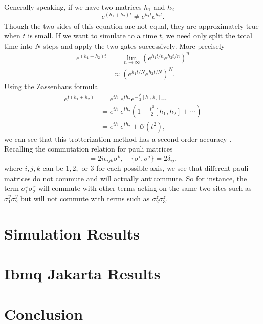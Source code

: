 \documentclass[aps,prl, reprint]{revtex4-2}
\begin{document}
Generally speaking, if we have two matrices $h_1$ and $h_2$
\begin{equation}
e^{(h_1 + h_2)t} \neq e^{h_1 t}e^{h_2 t}.
\end{equation}
Though the two sides of this equation are not equal, they are approximately true when $t$ is small. If we want to simulate to a time $t$, we need only split the total time into $N$ steps and apply the two gates successively. More precisely
\begin{align}
e^{(h_1 + h_2)t}&=\lim _{n \rightarrow \infty}\left(e^{h_1 t/ n} e^{h_2 t / n}\right)^{n}\\
&\approx \left(e^{h_1 t / N} e^{h_2 t/ N}\right)^{N}.
\end{align}
Using the Zassenhaus formula 
\begin{align*}
e^{t(h_1+h_2)}&=e^{t h_1} e^{t h_2} e^{-\frac{t^{2}}{2}[h_1, h_2]}\cdots\\
&= e^{t h_1} e^{t h_2}(1 -\frac{t^{2}}{2}[h_1, h_2] + \cdots)\\
&=e^{t h_1} e^{t h_2} + \mathcal{O}(t^2),
\end{align*}
we can see that this trotterization method has a second-order accuracy \cite{dupays2021closed}.
Recalling the commutation relation for pauli matrices
\begin{equation}
[\sigma^{i}, \sigma^{j}] = 2i \epsilon_{ijk}\sigma^{k}, \quad \{\sigma^{i}, \sigma^{j}\} = 2\delta_{ij	},
\end{equation}
where $i,j,k$ can be $1,2,$ or 3 for each possible axis, we see that different pauli matrices do not commute and will actually anticommute. So for instance, the term $\sigma_{1}^{x} \sigma_{2}^{x}$ will commute with other terms acting on the same two sites such as $\sigma_{1}^{y} \sigma_{2}^{y}$ but will not commute with terms such as $\sigma_{2}^{z} \sigma_{3}^{z}$.



\section{Simulation Results}

\section{Ibmq Jakarta Results}

\section{Conclusion}


\end{document}
